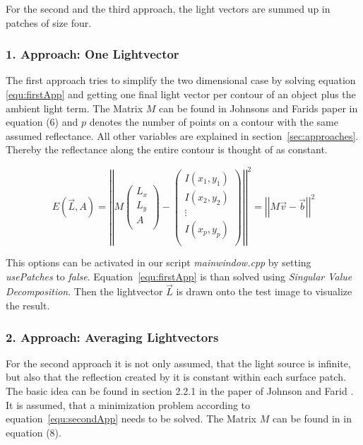 For the second and the third approach, the light vectors are summed up in patches of size four. 

\subsubsection{1. Approach: One Lightvector}\label{sec:appOne}
The first approach tries to simplify the two dimensional case by solving equation \ref{equ:firstApp} and getting one final light vector per contour of an object plus the ambient light term. The Matrix $M$ can be found in Johnsons and Farids paper \cite{Johnson} in equation (6) and $p$ denotes the number of points on a contour with the same assumed reflectance. All other variables are explained in section~\ref{sec:approaches}. Thereby the reflectance along the entire contour is thought of as constant. 

\begin{equation}
\label{equ:firstApp}
E(\vec{L} , A) = 
\left\vert \left\vert 
M
\begin{pmatrix}
L_{x} \\
L_{y} \\
A \\
\end{pmatrix} -
\begin{pmatrix}
I(x_{1} , y_{1}) \\
I(x_{2} , y_{2}) \\
\vdots \\
I(x_{p} , y_{p}) \\
\end{pmatrix}
 \right\vert\right\vert^{2}
 = \left\vert \left\vert  M\vec{v}-\vec{b}  \right\vert\right\vert^{2}
\end{equation}

This options can be activated in our script \textit{mainwindow.cpp} by setting \textit{usePatches} to \textit{false}. Equation~\ref{equ:firstApp} is than solved using \textit{Singular Value Decomposition}. Then the lightvector $\vec{L}$ is drawn onto the test image to visualize the result.  

\subsubsection{2. Approach: Averaging Lightvectors}\label{sec:appTwo}
For the second approach it is not only assumed, that the light source is infinite, but also that the reflection created by it is constant within each surface patch. The basic idea can be found in section 2.2.1 in the paper of Johnson and Farid \cite{Johnson}.\\
It is assumed, that a minimization problem according to equation~\ref{equ:secondApp} needs to be solved. The Matrix $M$ can be found in \cite{Johnson} in equation (8). \\

